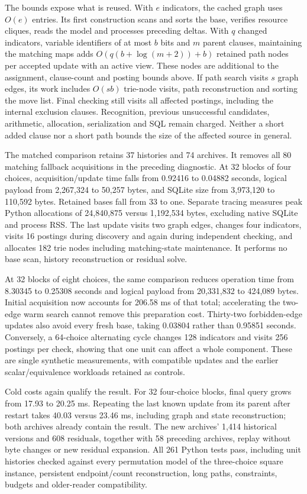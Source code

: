 \documentclass[11pt,a4paper]{article}
\numberwithin{equation}{section}
\theoremstyle{plain}
\theoremstyle{definition}
\theoremstyle{remark}
\begin{document}
The bounds expose what is reused. With $e$ indicators, the cached graph uses $O(e)$ entries. Its first construction scans and sorts the base, verifies resource cliques, reads the model and processes preceding deltas. With $q$ changed indicators, variable identifiers of at most $b$ bits and $m$ parent clauses, maintaining the matching maps adds $O(q(b+\log(m+2))+b)$ retained path nodes per accepted update with an active view. These nodes are additional to the assignment, clause-count and posting bounds above. If path search visits $s$ graph edges, its work includes $O(sb)$ trie-node visits, path reconstruction and sorting the move list. Final checking still visits all affected postings, including the internal exclusion clauses. Recognition, previous unsuccessful candidates, arithmetic, allocation, serialization and SQL remain charged. Neither a short added clause nor a short path bounds the size of the affected source in general.

The matched comparison retains 37 histories and 74 archives. It removes all 80 matching fallback acquisitions in the preceding diagnostic. At 32 blocks of four choices, acquisition/update time falls from 0.92416 to 0.04882 seconds, logical payload from 2,267,324 to 50,257 bytes, and SQLite size from 3,973,120 to 110,592 bytes. Retained bases fall from 33 to one. Separate tracing measures peak Python allocations of 24,840,875 versus 1,192,534 bytes, excluding native SQLite and process RSS. The last update visits two graph edges, changes four indicators, visits 16 postings during discovery and again during independent checking, and allocates 182 trie nodes including matching-state maintenance. It performs no base scan, history reconstruction or residual solve.

At 32 blocks of eight choices, the same comparison reduces operation time from 8.30345 to 0.25308 seconds and logical payload from 20,331,832 to 424,089 bytes. Initial acquisition now accounts for 206.58 ms of that total; accelerating the two-edge warm search cannot remove this preparation cost. Thirty-two forbidden-edge updates also avoid every fresh base, taking 0.03804 rather than 0.95851 seconds. Conversely, a 64-choice alternating cycle changes 128 indicators and visits 256 postings per check, showing that one unit can affect a whole component. These are single synthetic measurements, with compatible updates and the earlier scalar/equivalence workloads retained as controls.

Cold costs again qualify the result. For 32 four-choice blocks, final query grows from 17.93 to 20.25 ms. Repeating the last known update from its parent after restart takes 40.03 versus 23.46 ms, including graph and state reconstruction; both archives already contain the result. The new archives' 1,414 historical versions and 608 residuals, together with 58 preceding archives, replay without byte changes or new residual expansion. All 261 Python tests pass, including unit histories checked against every permutation model of the three-choice square instance, persistent endpoint/count reconstruction, long paths, constraints, budgets and older-reader compatibility.
\end{document}

